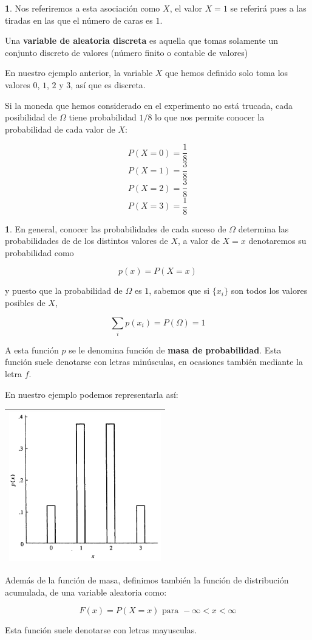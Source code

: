 \documentclass[]{book}
\theoremstyle{plain}
\theoremstyle{definition}
\theoremstyle{definition} %
\newcommand{\thistheoremname}{}
\newtheorem{genericthm}[theorem]{\thistheoremname}
\newenvironment{customdef}[1]
  {\renewcommand{\thistheoremname}{#1}%
   \begin{genericthm}}
  {\end{genericthm}}
\begin{document}
\begin{customdef}{Definición intuitiva de variable aleatoria}
Nos referiremos a esta asociación como \(X\), el valor \(X=1\) se
referirá pues a las tiradas en las que el número de caras es \(1\).

Una \textbf{variable de aleatoria discreta} es aquella que tomas
solamente un conjunto discreto de valores (número finito o contable de
valores)

En nuestro ejemplo anterior, la variable \(X\) que hemos definido solo
toma los valores \(0\), \(1\), \(2\) y \(3\), así que es discreta.

Si la moneda que hemos considerado en el experimento no está trucada,
cada posibilidad de \(\Omega\) tiene probabilidad \(1/8\) lo que nos
permite conocer la probabilidad de cada valor de \(X\):

\[P(X = 0) = \frac{1}{8}\] \[P(X = 1) = \frac{3}{8}\]
\[P(X = 2) = \frac{3}{8}\] \[P(X = 3) = \frac{1}{8}\]
\end{customdef}

\begin{customdef}{Función de masa de probabilidad}
  
En general, conocer las probabilidades de cada suceso de \(\Omega\)
determina las probabilidades de de los distintos valores de \(X\), a
valor de \(X=x\) denotaremos su probabilidad como

\[p(x) = P(X=x)\]

y puesto que la probabilidad de \(\Omega\) es \(1\), sabemos que si
\(\{x_i\}\) son todos los valores posibles de \(X\),

\[\sum_{i} p(x_i) = P(\Omega) = 1\]

A esta función \(p\) se le denomina función de \textbf{masa de
probabilidad}. Esta función suele denotarse con letras minúsculas, en
ocasiones también mediante la letra \(f\).

En nuestro ejemplo podemos representarla así:

\begin{longtable}[]{@{}l@{}}
\toprule
\endhead
\includegraphics[width=2.60417in,height=\textheight]{funcion_masa_discreta.png}\tabularnewline
\bottomrule
\end{longtable}

Además de la función de masa, definimos también la función de
distribución acumulada, de una variable aleatoria como:

\[ F(x) = P(X=x) \text{ para } -\infty < x < \infty\]

Esta función suele denotarse con letras mayusculas.
\end{customdef}
\end{document}
